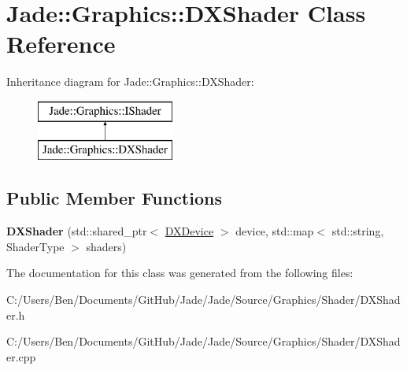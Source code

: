 \hypertarget{class_jade_1_1_graphics_1_1_d_x_shader}{}\section{Jade\+:\+:Graphics\+:\+:D\+X\+Shader Class Reference}
\label{class_jade_1_1_graphics_1_1_d_x_shader}
Inheritance diagram for Jade\+:\+:Graphics\+:\+:D\+X\+Shader\+:\begin{figure}[H]
\begin{center}
\leavevmode
\includegraphics[height=2.000000cm]{class_jade_1_1_graphics_1_1_d_x_shader}
\end{center}
\end{figure}
\subsection*{Public Member Functions}
\begin{DoxyCompactItemize}
\item 
\hypertarget{class_jade_1_1_graphics_1_1_d_x_shader_ad9d06be7dd908fefaccd5509cf3de2be}{}{\bfseries D\+X\+Shader} (std\+::shared\+\_\+ptr$<$ \hyperlink{class_jade_1_1_graphics_1_1_d_x_device}{D\+X\+Device} $>$ device, std\+::map$<$ std\+::string, Shader\+Type $>$ shaders)\label{class_jade_1_1_graphics_1_1_d_x_shader_ad9d06be7dd908fefaccd5509cf3de2be}

\end{DoxyCompactItemize}


The documentation for this class was generated from the following files\+:\begin{DoxyCompactItemize}
\item 
C\+:/\+Users/\+Ben/\+Documents/\+Git\+Hub/\+Jade/\+Jade/\+Source/\+Graphics/\+Shader/D\+X\+Shader.\+h\item 
C\+:/\+Users/\+Ben/\+Documents/\+Git\+Hub/\+Jade/\+Jade/\+Source/\+Graphics/\+Shader/D\+X\+Shader.\+cpp\end{DoxyCompactItemize}
